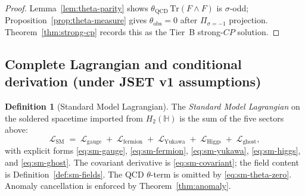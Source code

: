 \documentclass[aps,prd,onecolumn,amsmath,amssymb,nofootinbib,11pt]{revtex4-2}
\numberwithin{equation}{section}
\theoremstyle{plain}
\theoremstyle{definition}
\newtheorem{definition}[theorem]{Definition}
\theoremstyle{remark}
\newcommand{\Quat}{\mathbb{H}}
\begin{document}
\begin{proof}
Lemma~\ref{lem:theta-parity} shows $\theta_{\mathrm{QCD}}\,
\mathrm{Tr}(F\wedge F)$ is $\sigma$-odd; Proposition~\ref{prop:theta-measure}
gives $\theta_{\mathrm{obs}}=0$ after $\Pi_{\sigma=-1}$ projection.
Theorem~\ref{thm:strong-cp} records this as the Tier~B strong-$CP$ solution.
\end{proof}

\subsection{Complete Lagrangian and conditional derivation (under JSET v1 assumptions)}
\label{sec:sm-lagrangian:complete}

\begin{definition}[Standard Model Lagrangian]\label{def:sm-lagrangian}
The \emph{Standard Model Lagrangian} on the soldered spacetime imported from
$H_2(\Quat)$ is the sum of the five sectors above:
\begin{equation}\label{eq:sm-lagrangian}
  \mathcal{L}_{\mathrm{SM}}
  \;=\;
  \mathcal{L}_{\mathrm{gauge}}
  \;+\;
  \mathcal{L}_{\mathrm{fermion}}
  \;+\;
  \mathcal{L}_{\mathrm{Yukawa}}
  \;+\;
  \mathcal{L}_{\mathrm{Higgs}}
  \;+\;
  \mathcal{L}_{\mathrm{ghost}},
\end{equation}
with explicit forms \eqref{eq:sm-gauge}, \eqref{eq:sm-fermion},
\eqref{eq:sm-yukawa}, \eqref{eq:sm-higgs}, and \eqref{eq:sm-ghost}. The
covariant derivative is \eqref{eq:sm-covariant}; the field content is
Definition~\ref{def:sm-fields}. The QCD $\theta$-term is omitted by
\eqref{eq:sm-theta-zero}. Anomaly cancellation is enforced by
Theorem~\ref{thm:anomaly}.
\end{definition}
\end{document}
